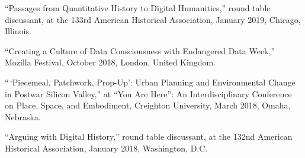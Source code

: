 ``Passages from Quantitative History to Digital Humanities,'' round
table discussant, at the 133rd American Historical Association, January
2019, Chicago, Illinois.

``Creating a Culture of Data Consciousness with Endangered Data Week,''
Mozilla Festival, October 2018, London, United Kingdom.

``\,`Piecemeal, Patchwork, Prop-Up': Urban Planning and Environmental
Change in Postwar Silicon Valley,'' at ``You Are Here'': An
Interdisciplinary Conference on Place, Space, and Embodiment, Creighton
University, March 2018, Omaha, Nebraska.

``Arguing with Digital History,'' round table discussant, at the 132nd
American Historical Association, January 2018, Washington, D.C.
